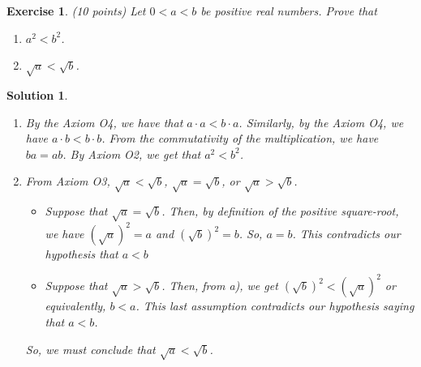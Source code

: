 \documentclass[12pt]{article}
\newcommand{\bN}{\mathbb{N}}
\newcommand{\Ra}{\Rightarrow}
\theoremstyle{plain}
\newtheorem{exer}{\textbf{Exercise}}}
\theoremstyle{plain}
\newtheorem*{sol}{\textbf{Solution}}}
\theoremstyle{plain}
\theoremstyle{plain}
\begin{document}
	





\begin{exer}
(10 points)
Let $0 < a < b$ be positive real numbers. Prove that
	\begin{enumerate}[label=\textbf{\alph*)}]
	\item $a^2 < b^2$.
	\item $\sqrt{a} < \sqrt{b}$.\label{Exo:squareInequality}
	\end{enumerate}
\end{exer}
\begin{sol}
\begin{enumerate}[label=\textbf{\alph*)}]
\item By the Axiom O4, we have that $a\cdot a < b \cdot a$. Similarly, by the Axiom O4, we have $a \cdot b < b \cdot b$. From the commutativity of the multiplication, we have $b a = ab$. By Axiom O2, we get that $a^2 < b^2$.
\item From Axiom O3, $\sqrt{a} < \sqrt{b}$, $\sqrt{a} = \sqrt{b}$, or $\sqrt{a} > \sqrt{b}$.
	\begin{itemize}
	\item Suppose that $\sqrt{a} = \sqrt{b}$. Then, by definition of the positive square-root, we have $(\sqrt{a})^2 = a$ and $(\sqrt{b})^2 = b$. So, $a = b$. This contradicts our hypothesis that $a < b$
	\item Suppose that $\sqrt{a} > \sqrt{b}$. Then, from a), we get $(\sqrt{b})^2 < (\sqrt{a})^2$ or equivalently, $b < a$. This last assumption contradicts our hypothesis saying that $a < b$.
	\end{itemize}
	So, we must conclude that $\sqrt{a} < \sqrt{b}$.
\end{enumerate}
\end{sol}
\end{document}
